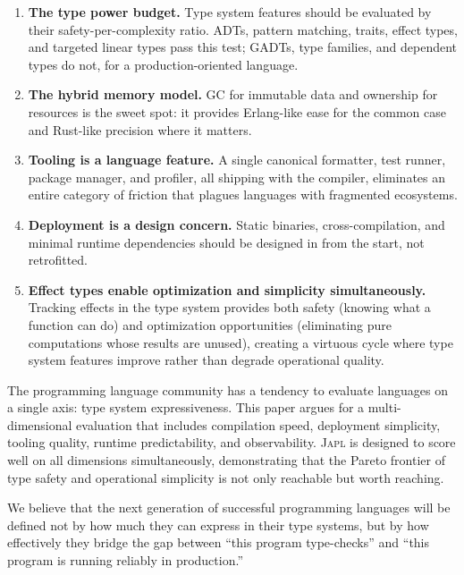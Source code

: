 \documentclass[11pt,twocolumn]{article}
\newcommand{\japl}{\textsc{Japl}}
\begin{document}
\begin{enumerate}[leftmargin=*]
\item \textbf{The type power budget.} Type system features should be evaluated by their safety-per-complexity ratio. ADTs, pattern matching, traits, effect types, and targeted linear types pass this test; GADTs, type families, and dependent types do not, for a production-oriented language.

\item \textbf{The hybrid memory model.} GC for immutable data and ownership for resources is the sweet spot: it provides Erlang-like ease for the common case and Rust-like precision where it matters.

\item \textbf{Tooling is a language feature.} A single canonical formatter, test runner, package manager, and profiler, all shipping with the compiler, eliminates an entire category of friction that plagues languages with fragmented ecosystems.

\item \textbf{Deployment is a design concern.} Static binaries, cross-compilation, and minimal runtime dependencies should be designed in from the start, not retrofitted.

\item \textbf{Effect types enable optimization and simplicity simultaneously.} Tracking effects in the type system provides both safety (knowing what a function can do) and optimization opportunities (eliminating pure computations whose results are unused), creating a virtuous cycle where type system features improve rather than degrade operational quality.
\end{enumerate}

The programming language community has a tendency to evaluate languages on a single axis: type system expressiveness.
This paper argues for a multi-dimensional evaluation that includes compilation speed, deployment simplicity, tooling quality, runtime predictability, and observability.
\japl{} is designed to score well on all dimensions simultaneously, demonstrating that the Pareto frontier of type safety and operational simplicity is not only reachable but worth reaching.

We believe that the next generation of successful programming languages will be defined not by how much they can express in their type systems, but by how effectively they bridge the gap between ``this program type-checks'' and ``this program is running reliably in production.''
\end{document}
